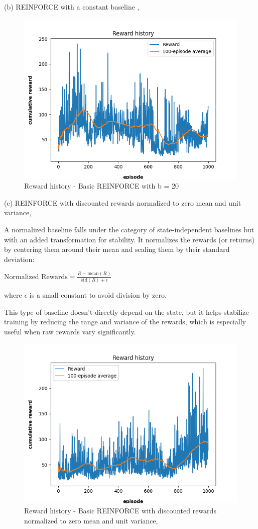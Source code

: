 \documentclass{article}
\begin{document}
(b) REINFORCE with a constant baseline ,

\begin{figure}[h]
	\centering
	\includegraphics[width=0.5\linewidth]{../data/plot/reward_history_ContinuousCartPole-v0_0_constant_baseline.png}
	\caption{Reward history - Basic REINFORCE with b = 20}
	\label{fig:plot4}
\end{figure}
(c) REINFORCE with discounted rewards normalized to zero mean and unit variance,

A normalized baseline falls under the category of state-independent baselines but with an added transformation for stability. It normalizes the rewards (or returns) by centering them around their mean and scaling them by their standard deviation:

$\text{Normalized Rewards} = \frac{R - \text{mean}(R)}{\text{std}(R) + \epsilon}$

where  $\epsilon$  is a small constant to avoid division by zero.

This type of baseline doesn’t directly depend on the state, but it helps stabilize training by reducing the range and variance of the rewards, which is especially useful when raw rewards vary significantly.

\begin{figure}[h]
	\centering
	\includegraphics[width=0.5\linewidth]{../data/plot/reward_history_ContinuousCartPole-v0_0_normalized.png}
	\caption{Reward history - Basic REINFORCE with discounted rewards normalized to zero mean and unit variance,}
	\label{fig:plot5}
\end{figure}
\end{document}
